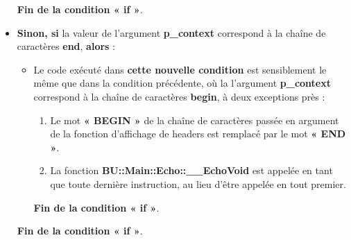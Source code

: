 \documentclass[a4paper,10pt]{article}
\begin{document}
\begin{itemize}
{\begin{itemize}
{                \begin{justify}
                    \textbf{\color{cond}Fin de la condition « if »}.
                \end{justify}
            }
        \end{itemize}
    }

    \item
    {
        \setlength{\parskip}{2em}

        \begin{justify}
            \textbf{\color{cond}Sinon, si} la valeur de l'argument \textbf{\color{vars}p\_context} correspond à la chaîne de caractères \textbf{end}, \textbf{\color{cond}alors} :
        \end{justify}

        \setlength{\parskip}{1em}

        \begin{itemize}
            \item
            {
                \begin{justify}
                    Le code exécuté dans \textbf{\color{cond}cette nouvelle condition} est sensiblement le même que dans la condition précédente, où la l'argument \textbf{\color{vars}p\_context} correspond à la chaîne de caractères \textbf{begin}, à deux exceptions près :
                    
                    \begin{enumerate}
                        \item Le mot \textbf{« BEGIN »} de la chaîne de caractères passée en argument de la fonction d'affichage de headers est remplacé par le mot \textbf{« END »}.

                        \item La fonction \textbf{\color{func}BU::Main::Echo::\_\_EchoVoid} est appelée en tant que toute dernière instruction, au lieu d'être appelée en tout premier. 
                    \end{enumerate}
                \end{justify}\setlength{\parskip}{1em}
                
                \begin{justify}
                    \textbf{\color{cond}Fin de la condition « if »}.
                \end{justify}
            }
        \end{itemize}

        \begin{justify}
            \textbf{\color{cond}Fin de la condition « if »}.
        \end{justify}
    }
\end{itemize}
\end{document}
